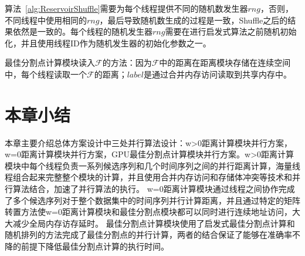 算法~\ref{alg:ReservoirShuffle}需要为每个线程提供不同的随机数发生器$rng$，否则，不同线程中使用相同的$rng$，最后导致随机数生成的过程是一致，Shuffle之后的结果依然是一致的。每个线程的随机发生器$rng$需要在进行启发式算法之前随机初始化，并且使用线程ID作为随机发生器的初始化参数之一。

最佳分割点计算模块读入$\mathcal{F}$的方法：因为$\mathcal{F}$中的距离在距离模块存储在连续空间中，每个线程读取一个$\mathcal{F}$的距离；$label$是通过合并内存访问读取到共享内存中。


\section{本章小结}

本章主要介绍总体方案设计中三处并行算法设计：w>0距离计算模块并行方案，w=0距离计算模块并行方案，GPU最佳分割点计算模块并行方案。w>0距离计算模块中每个线程负责一系列候选序列和几个时间序列之间的并行距离计算，海量线程组合起来完整整个模块的计算，并且使用合并内存访问和存储体冲突等技术和并行算法结合，加速了并行算法的执行。
w=0距离计算模块通过线程之间协作完成了多个候选序列对于整个数据集中的时间序列并行计算距离，并且通过特定的矩阵转置方法使w=0距离计算模块和最佳分割点模块都可以同时进行连续地址访问，大大减少全局内存访存延时。
最佳分割点计算模块使用了启发式最佳分割点计算和随机排列的方法完成了最佳分割点的并行计算，两者的结合保证了能够在准确率不降的前提下降低最佳分割点计算的执行时间。

